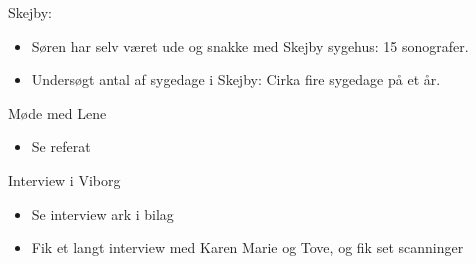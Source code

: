 Skejby:
\begin{itemize}
\item Søren har selv været ude og snakke med Skejby sygehus: 15 sonografer. 
\item Undersøgt antal af sygedage i Skejby: Cirka fire sygedage på et år.  
\end{itemize}
Møde med Lene
\begin{itemize}
\item Se referat
\end{itemize}
Interview i Viborg
\begin{itemize}
\item Se interview ark i bilag
\item Fik et langt interview med Karen Marie og Tove, og fik set scanninger
\end{itemize}
\newpage